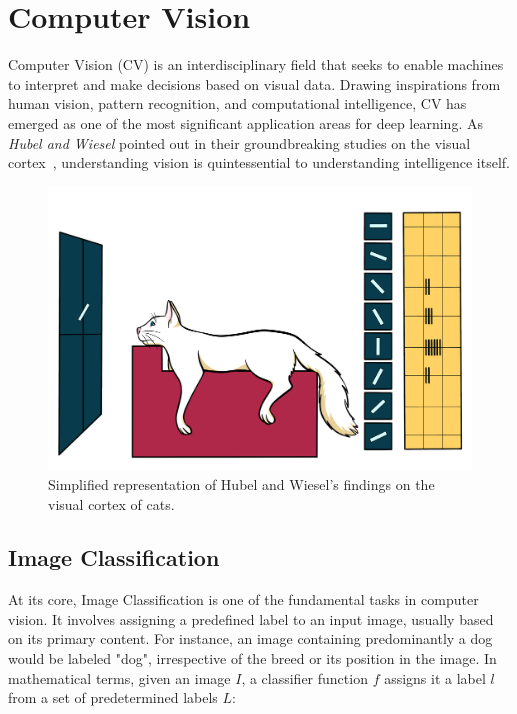 \section{Computer Vision}

Computer Vision (CV) is an interdisciplinary field that seeks to enable machines to interpret and make decisions based on visual data. Drawing inspirations from human vision, pattern recognition, and computational intelligence, CV has emerged as one of the most significant application areas for deep learning. As \textit{Hubel and Wiesel} pointed out in their groundbreaking studies 
on the visual cortex~\cite{Hubel1962ReceptiveFB}, understanding vision is quintessential to understanding intelligence itself.

\begin{figure}[htbp]
    \centering
    \includegraphics[scale=.3]{figures/cat_experiment.png}
    \caption{Simplified representation of Hubel and Wiesel’s findings on the visual cortex of cats.~\cite{futurelearn2023} }
    \label{fig:lenet}
\end{figure}

\subsection{Image Classification}

At its core, Image Classification is one of the fundamental tasks in computer vision. It involves assigning a predefined label to an input image, usually based on its primary content. For instance, an image containing predominantly a dog would be labeled "dog", irrespective of the breed or its position in the image. In mathematical terms, given an image \(I\), a classifier function \(f\) assigns it a label \(l\) from a set of predetermined labels \(L\):

